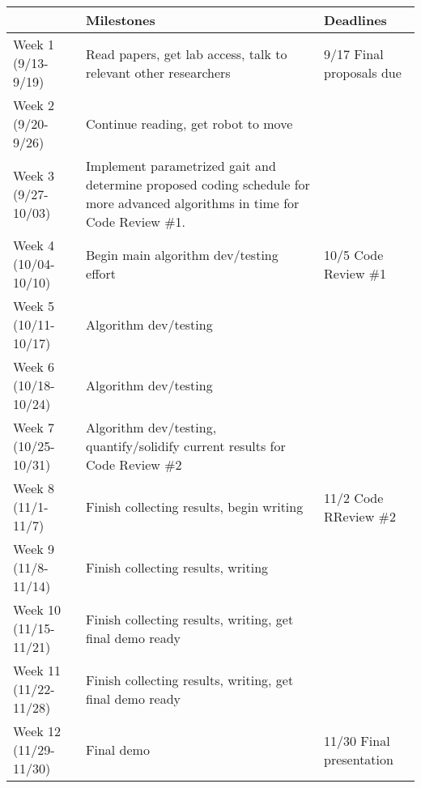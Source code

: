 \begin{center}
\begin{tabular}{|l||p{2.5in}|p{1.5in}|}
\hline
                        & {\bf Milestones} & {\bf Deadlines}
\\ \hline

Week 1 (9/13-9/19)    & Read papers, get lab access, talk to relevant other researchers & 9/17 Final proposals due
\\ \hline

Week 2 (9/20-9/26)    & Continue reading, get robot to move &
\\ \hline

Week 3 (9/27-10/03)   & Implement parametrized gait and determine proposed coding schedule for more advanced algorithms in time for Code Review \#1. &
\\ \hline

Week 4 (10/04-10/10)  & Begin main algorithm dev/testing effort & 10/5 Code Review \#1
\\ \hline

Week 5 (10/11-10/17)  & Algorithm dev/testing &
\\ \hline

Week 6 (10/18-10/24)  & Algorithm dev/testing &
\\ \hline

Week 7 (10/25-10/31)  & Algorithm dev/testing, quantify/solidify current results for Code Review \#2 &
\\ \hline

Week 8 (11/1-11/7)    & Finish collecting results, begin writing & 11/2 Code RReview \#2
\\ \hline

Week 9 (11/8-11/14)   & Finish collecting results, writing &
\\ \hline

Week 10 (11/15-11/21) & Finish collecting results, writing, get final demo ready &
\\ \hline

Week 11 (11/22-11/28) & Finish collecting results, writing, get final demo ready  &
\\ \hline

Week 12 (11/29-11/30) & Final demo  & 11/30 Final presentation
\\ \hline
\end{tabular}
\end{center}
